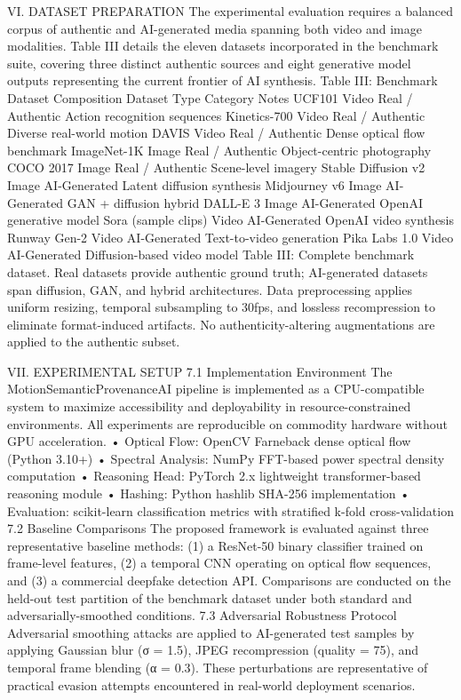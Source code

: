 VI.  DATASET PREPARATION
The experimental evaluation requires a balanced corpus of authentic and AI-generated media spanning both video and image modalities. Table III details the eleven datasets incorporated in the benchmark suite, covering three distinct authentic sources and eight generative model outputs representing the current frontier of AI synthesis.
Table III: Benchmark Dataset Composition
Dataset	Type	Category	Notes
UCF101	Video	Real / Authentic	Action recognition sequences
Kinetics-700	Video	Real / Authentic	Diverse real-world motion
DAVIS	Video	Real / Authentic	Dense optical flow benchmark
ImageNet-1K	Image	Real / Authentic	Object-centric photography
COCO 2017	Image	Real / Authentic	Scene-level imagery
Stable Diffusion v2	Image	AI-Generated	Latent diffusion synthesis
Midjourney v6	Image	AI-Generated	GAN + diffusion hybrid
DALL-E 3	Image	AI-Generated	OpenAI generative model
Sora (sample clips)	Video	AI-Generated	OpenAI video synthesis
Runway Gen-2	Video	AI-Generated	Text-to-video generation
Pika Labs 1.0	Video	AI-Generated	Diffusion-based video model
Table III: Complete benchmark dataset. Real datasets provide authentic ground truth; AI-generated datasets span diffusion, GAN, and hybrid architectures.
Data preprocessing applies uniform resizing, temporal subsampling to 30fps, and lossless recompression to eliminate format-induced artifacts. No authenticity-altering augmentations are applied to the authentic subset.

VII.  EXPERIMENTAL SETUP
7.1  Implementation Environment
The MotionSemanticProvenanceAI pipeline is implemented as a CPU-compatible system to maximize accessibility and deployability in resource-constrained environments. All experiments are reproducible on commodity hardware without GPU acceleration.
•	Optical Flow: OpenCV Farneback dense optical flow (Python 3.10+)
•	Spectral Analysis: NumPy FFT-based power spectral density computation
•	Reasoning Head: PyTorch 2.x lightweight transformer-based reasoning module
•	Hashing: Python hashlib SHA-256 implementation
•	Evaluation: scikit-learn classification metrics with stratified k-fold cross-validation
7.2  Baseline Comparisons
The proposed framework is evaluated against three representative baseline methods: (1) a ResNet-50 binary classifier trained on frame-level features, (2) a temporal CNN operating on optical flow sequences, and (3) a commercial deepfake detection API. Comparisons are conducted on the held-out test partition of the benchmark dataset under both standard and adversarially-smoothed conditions.
7.3  Adversarial Robustness Protocol
Adversarial smoothing attacks are applied to AI-generated test samples by applying Gaussian blur (σ = 1.5), JPEG recompression (quality = 75), and temporal frame blending (α = 0.3). These perturbations are representative of practical evasion attempts encountered in real-world deployment scenarios.

